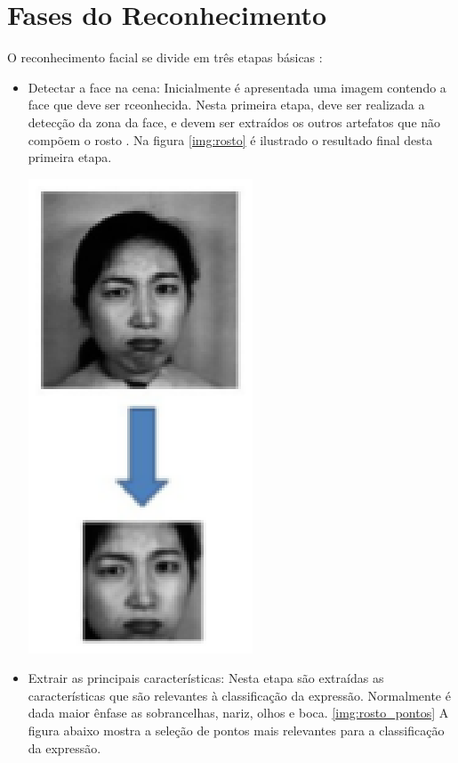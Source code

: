 \section{Fases do Reconhecimento}
O reconhecimento facial se divide em três etapas básicas \cite{Elizabeth}:
\begin{itemize}
\item Detectar a face na cena: Inicialmente é apresentada uma imagem contendo a face que deve ser rceonhecida. Nesta primeira etapa, deve ser realizada a detecção da zona da face, e devem ser extraídos os outros artefatos que não compõem o rosto \cite{FernandoGil}.
Na figura \ref{img:rosto} é ilustrado o resultado final desta primeira etapa. \\
\begin{center} 
	\includegraphics[scale=0.8]{graficos/rosto}
	\label{img:rosto}
	\cite{Elizabeth}
\end{center}
\item Extrair as principais características: Nesta etapa são extraídas as características que são relevantes à classificação da expressão. Normalmente é dada maior ênfase as sobrancelhas, nariz, olhos e boca. \ref{img:rosto_pontos}
A figura abaixo mostra a seleção de pontos mais relevantes para a classificação da expressão. 

\end{itemize}

